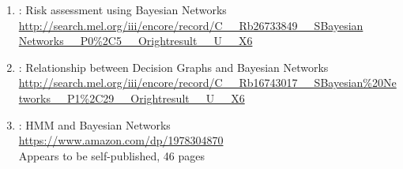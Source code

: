 \begin{enumerate}
  \item {}: Risk assessment using Bayesian Networks
    \\{\scs\url{http://search.mel.org/iii/encore/record/C__Rb26733849__SBayesian Networks__P0%2C5__Orightresult__U__X6}}

  \item {}: Relationship between Decision Graphs and Bayesian Networks
    \\{\scs\url{http://search.mel.org/iii/encore/record/C__Rb16743017__SBayesian%20Networks__P1%2C29__Orightresult__U__X6}}

  \item {}: HMM and Bayesian Networks
     \\\url{https://www.amazon.com/dp/1978304870}
     \\Appears to be self-published, 46 pages

\end{enumerate}


